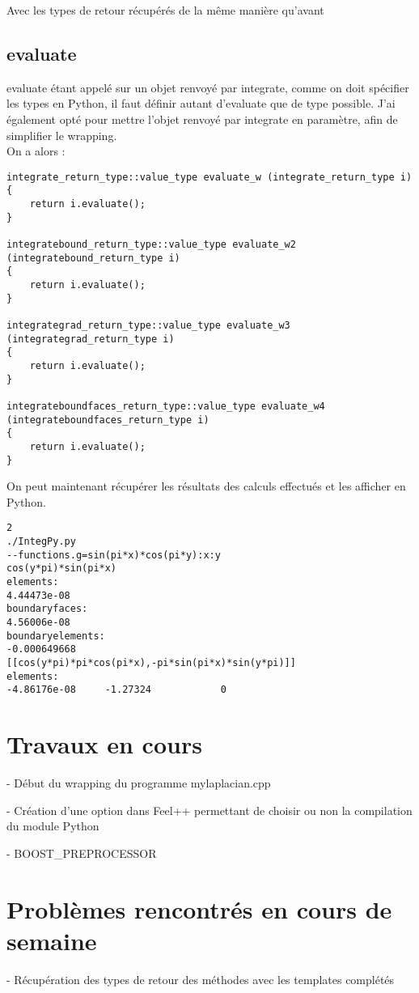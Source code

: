 \documentclass[12pt]{article}
\begin{document}
Avec les types de retour récupérés de la même manière qu'avant

\subsection{evaluate}

evaluate étant appelé sur un objet renvoyé par integrate, comme on doit spécifier les types en Python, il faut définir autant d'evaluate que de type possible. J'ai également opté pour mettre l'objet renvoyé par integrate en paramètre, afin de simplifier le wrapping.\\
On a alors :
\begin{lstlisting}
integrate_return_type::value_type evaluate_w (integrate_return_type i)
{
    return i.evaluate();
}

integratebound_return_type::value_type evaluate_w2 (integratebound_return_type i)
{
    return i.evaluate();
}

integrategrad_return_type::value_type evaluate_w3 (integrategrad_return_type i)
{
    return i.evaluate();
}

integrateboundfaces_return_type::value_type evaluate_w4 (integrateboundfaces_return_type i)
{
    return i.evaluate();
}
\end{lstlisting}

On peut maintenant récupérer les résultats des calculs effectués et les afficher en Python.

\begin{verbatim}
2
./IntegPy.py
--functions.g=sin(pi*x)*cos(pi*y):x:y
cos(y*pi)*sin(pi*x)
elements:
4.44473e-08
boundaryfaces:
4.56006e-08
boundaryelements:
-0.000649668
[[cos(y*pi)*pi*cos(pi*x),-pi*sin(pi*x)*sin(y*pi)]]
elements:
-4.86176e-08     -1.27324            0
\end{verbatim}

\section{Travaux en cours}
- Début du wrapping du programme mylaplacian.cpp

- Création d'une option dans Feel++ permettant de choisir ou non la compilation du module Python

- BOOST\_PREPROCESSOR

\section{Problèmes rencontrés en cours de semaine}
- Récupération des types de retour des méthodes avec les templates complétés \\
\end{document}
